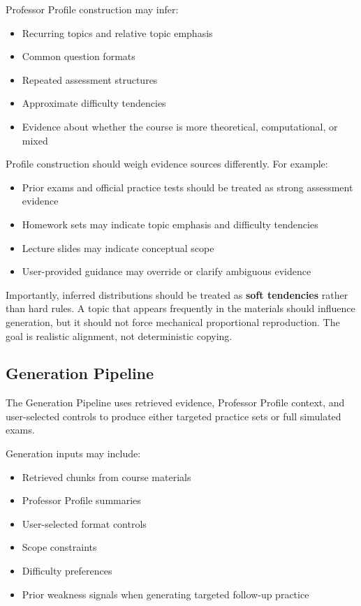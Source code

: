 \documentclass[11pt]{article}
\begin{document}
Professor Profile construction may infer:
\begin{itemize}
\item Recurring topics and relative topic emphasis
\item Common question formats
\item Repeated assessment structures
\item Approximate difficulty tendencies
\item Evidence about whether the course is more theoretical, computational, or mixed
\end{itemize}

Profile construction should weigh evidence sources differently. For example:
\begin{itemize}
\item Prior exams and official practice tests should be treated as strong assessment evidence
\item Homework sets may indicate topic emphasis and difficulty tendencies
\item Lecture slides may indicate conceptual scope
\item User-provided guidance may override or clarify ambiguous evidence
\end{itemize}

Importantly, inferred distributions should be treated as \textbf{soft tendencies} rather than hard rules. A topic that appears frequently in the materials should influence generation, but it should not force mechanical proportional reproduction. The goal is realistic alignment, not deterministic copying.

\subsection{Generation Pipeline}
The Generation Pipeline uses retrieved evidence, Professor Profile context, and user-selected controls to produce either targeted practice sets or full simulated exams.

Generation inputs may include:
\begin{itemize}
\item Retrieved chunks from course materials
\item Professor Profile summaries
\item User-selected format controls
\item Scope constraints
\item Difficulty preferences
\item Prior weakness signals when generating targeted follow-up practice
\end{itemize}
\end{document}
